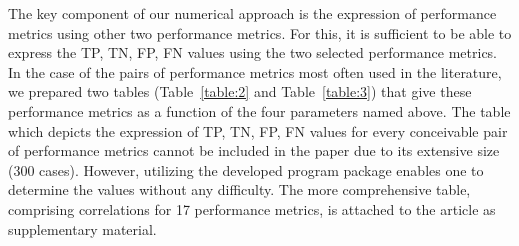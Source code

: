 \documentclass[3p,times]{elsarticle}
\begin{document}
The key component of our numerical approach is the expression of performance metrics using other two performance metrics.  For this, it is sufficient to be able to express the TP, TN, FP, FN values using the two selected performance metrics. In the case of the pairs of performance metrics most often used in the literature, we prepared two tables (Table~\ref{table:2} and Table~\ref{table:3}) that give these performance metrics as a function of the four parameters named above. The table which depicts the expression of TP, TN, FP, FN values for every conceivable pair of performance metrics cannot be included in the paper due to its extensive size (300 cases). However, utilizing the developed program package enables one to determine the values without any difficulty. The more comprehensive table, comprising correlations for 17 performance metrics, is attached to the article as supplementary material.
\end{document}
